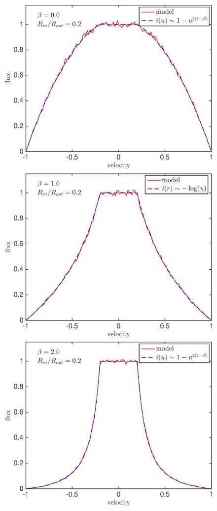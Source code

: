 \documentclass[useAMS,usenatbib,usegraphicx]{mnras}
\begin{document}
\begin{figure}
\includegraphics[trim =25 25 45 15,clip=true,scale=0.34]{params/A/b0_r0_2} 
\includegraphics[trim =33 25 45 15,clip=true,scale=0.34]{params/A/b1_r0_2}
\includegraphics[trim =33 25 45 15,clip=true,scale=0.34]{params/A/b2_r0_2}

\end{figure}
\end{document}
